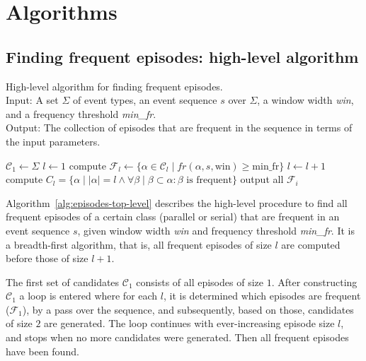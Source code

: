 \section{Algorithms}

\subsection{Finding frequent episodes: high-level algorithm}

\begin{algorithm}

\caption{High-level algorithm for finding frequent episodes. \\
Input: A set $ \Sigma $ of event types, an event sequence $ s $ over $ \Sigma $, a window width \emph{win}, and a frequency threshold \emph{min\_fr}. \\
Output: The collection of episodes that are frequent in the sequence in terms of the input parameters.
}

\begin{algorithmic}[1]

\State $ \mathcal{C}_1 \gets \Sigma $
\State $ l \gets 1 $
    \State compute $ \mathcal{F}_l \gets \{ \alpha \in \mathcal{C}_l \mid fr(\alpha, s, \text{win}) \geq \text{min\_fr} \} $
    \State $ l \gets l + 1 $
    \State compute $ C_l = \{ \alpha \mid | \alpha | = l \wedge \forall \beta \mid \beta \subset \alpha : \beta \text{ is frequent} \} $
\EndWhile
\State output all $ \mathcal{F}_i $

\end{algorithmic}

\label{alg:episodes-top-level}
\end{algorithm}


Algorithm~\ref{alg:episodes-top-level} describes the high-level procedure to find all frequent episodes of a certain class (parallel or serial) that are frequent in an event sequence $ s $, given window width \emph{win} and frequency threshold \emph{min\_fr}. It is a breadth-first algorithm, that is, all frequent episodes of size $ l $ are computed before those of size $ l + 1 $.

The first set of candidates $ \mathcal{C}_1 $ consists of all episodes of size $ 1 $. After constructing $ \mathcal{C}_1 $ a loop is entered where for each $ l $, it is determined which episodes are frequent ($ \mathcal{F}_1 $), by a pass over the sequence, and subsequently, based on those, candidates of size $ 2 $ are generated. The loop continues with ever-increasing episode size $ l $, and stops when no more candidates were generated. Then all frequent episodes have been found.

